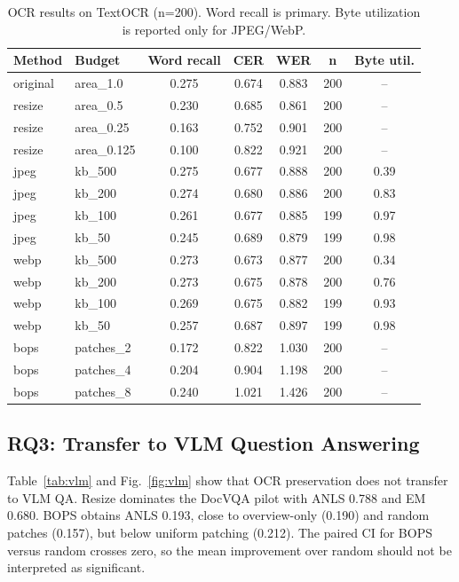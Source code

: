 \documentclass[conference]{IEEEtran}
\newcommand{\method}{BOPS}
\newcommand{\datasetocr}{TextOCR}
\begin{document}
\begin{table}[!ht]
\centering
\caption{OCR results on \datasetocr{} (n=200). Word recall is primary. Byte utilization is reported only for JPEG/WebP.}
\label{tab:ocr}
\begin{tabular}{llccccc}
\toprule
Method & Budget & Word recall & CER & WER & n & Byte util. \\
\midrule
original & area\_1.0 & 0.275 & 0.674 & 0.883 & 200 & -- \\
resize & area\_0.5 & 0.230 & 0.685 & 0.861 & 200 & -- \\
resize & area\_0.25 & 0.163 & 0.752 & 0.901 & 200 & -- \\
resize & area\_0.125 & 0.100 & 0.822 & 0.921 & 200 & -- \\
jpeg & kb\_500 & 0.275 & 0.677 & 0.888 & 200 & 0.39 \\
jpeg & kb\_200 & 0.274 & 0.680 & 0.886 & 200 & 0.83 \\
jpeg & kb\_100 & 0.261 & 0.677 & 0.885 & 199 & 0.97 \\
jpeg & kb\_50 & 0.245 & 0.689 & 0.879 & 199 & 0.98 \\
webp & kb\_500 & 0.273 & 0.673 & 0.877 & 200 & 0.34 \\
webp & kb\_200 & 0.273 & 0.675 & 0.878 & 200 & 0.76 \\
webp & kb\_100 & 0.269 & 0.675 & 0.882 & 199 & 0.93 \\
webp & kb\_50 & 0.257 & 0.687 & 0.897 & 199 & 0.98 \\
bops & patches\_2 & 0.172 & 0.822 & 1.030 & 200 & -- \\
bops & patches\_4 & 0.204 & 0.904 & 1.198 & 200 & -- \\
bops & patches\_8 & 0.240 & 1.021 & 1.426 & 200 & -- \\
\bottomrule
\end{tabular}
\end{table}

\subsection{RQ3: Transfer to VLM Question Answering}
Table~\ref{tab:vlm} and Fig.~\ref{fig:vlm} show that OCR preservation does not transfer to VLM QA. Resize dominates the DocVQA pilot with ANLS 0.788 and EM 0.680. \method{} obtains ANLS 0.193, close to overview-only (0.190) and random patches (0.157), but below uniform patching (0.212). The paired CI for \method{} versus random crosses zero, so the mean improvement over random should not be interpreted as significant.
\end{document}
